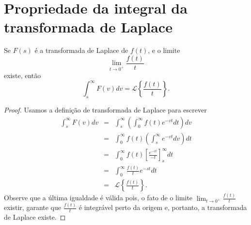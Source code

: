 \section{Propriedade da integral da transformada de Laplace}
\begin{propr}{\label{prop_int_transf}}Se $F(s)$ é a transformada de Laplace de $f(t)$, e o limite
$$
\lim_{t\to 0^+}\frac{f(t)}{t}
$$
existe, então
\begin{equation}
\int_s^\infty F(v)dv =\mathcal{L}\left\{\frac{f(t)}{t}\right\}.
\end{equation}
 \end{propr}
\begin{proof} Usamos a definição de transformada de Laplace para escrever
\begin{eqnarray*}
\int_s^\infty F(v)dv&=&\int_s^\infty\left(\int_0^\infty f(t)e^{-vt}dt\right)dv\\
&=&\int_0^\infty f(t)\left(\int_s^\infty e^{-vt} dv \right)dt\\
&=&\int_0^\infty f(t)\left[\frac{ e^{-vt}}{-t} \right]_s^\infty dt\\
&=&\int_0^\infty \frac{f(t)}{t} e^{-st}  dt\\
&=&\mathcal{L}\left\{ \frac{f(t)}{t} \right\}.
\end{eqnarray*}
Observe que a última igualdade é válida pois, o fato de o limite $\lim_{t\to 0^+}\frac{f(t)}{t}$ existir, garante que $\frac{f(t)}{t}$ é integrável perto da origem e, portanto, a transformada de Laplace existe.
\end{proof}
